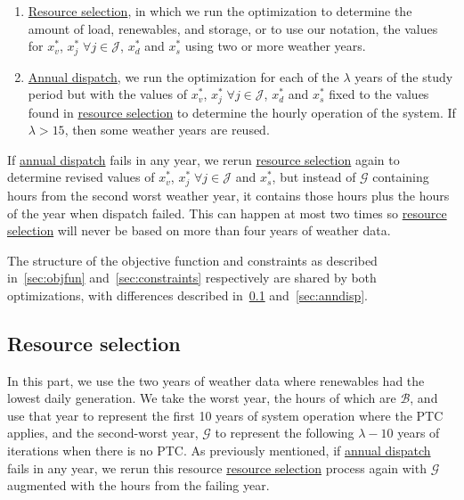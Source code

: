 \documentclass[9pt, oneside]{article}
\numberwithin{equation}{subsubsection}
\begin{document}
\begin{enumerate}
	\item \hyperref[sec:res]{Resource selection}, in which we run the optimization to
	      determine the amount of load, renewables, and storage, or to use our notation,
	      the values for $x_v^*$, $x_j^* \;\forall j \in \mathcal{J}$, $x_d^*$ and $x_s^*$ using two or
	      more weather years.
	\item \hyperref[sec:anndisp]{Annual dispatch}, we run the optimization
	      for each of the $\lambda$ years of the study period but with the values of
	      $x_v^*$, $x_j^* \;\forall j \in \mathcal{J}$, $x_d^*$ and $x_s^*$ fixed to the values found in
	      \hyperref[sec:res]{resource selection} to determine the hourly operation of
	      the system. If $\lambda > 15$, then some weather years are reused.
\end{enumerate}

If \hyperref[sec:anndisp]{annual dispatch} fails in any year, we rerun \hyperref[sec:res]{resource selection} again to determine revised values of $x_v^*$, $x_j^* \;\forall j \in \mathcal{J}$ and $x_s^*$, but instead of $\mathcal{G}$ containing hours from the second worst weather year, it contains those hours plus the hours of the year when dispatch failed.
This can happen at most two times so \hyperref[sec:res]{resource selection} will never be based on more than four years of weather data.

The structure of the objective function and constraints as described in~\ref{sec:objfun} and~\ref{sec:constraints} respectively are shared by both optimizations, with differences described in~\ref{sec:res} and~\ref{sec:anndisp}.

\subsection{Resource selection}\label{sec:res}
In this part, we use the two years of weather data where renewables had the lowest daily generation.
We take the worst year, the hours of which are $\mathcal{B}$, and use that year to represent the first 10 years of system operation where the PTC applies, and the second-worst year, $\mathcal{G}$ to represent the following $\lambda - 10$ years of iterations when there is no PTC\@.
As previously mentioned, if \hyperref[sec:anndisp]{annual dispatch} fails in any year, we rerun this resource \hyperref[sec:res]{resource selection} process again with $\mathcal{G}$ augmented with the hours from the failing year.
\end{document}
